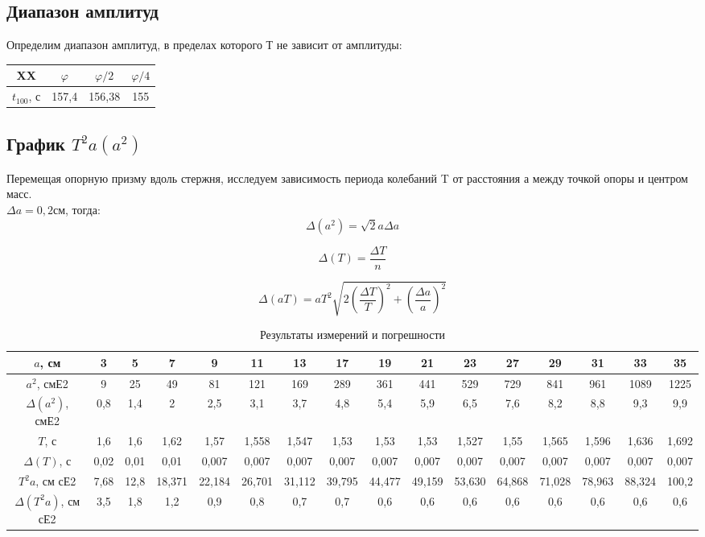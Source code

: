 \documentclass[13pt,a4paper]{article}
\begin{document}
\subsection{Диапазон амплитуд}

Определим диапазон амплитуд, в пределах которого Т не зависит от амплитуды:

\begin{center}
\begin{tabular}{|c|c|c|c|}
\hline
XX & $\varphi$ & $\varphi/2$ & $\varphi/4$ \\ \hline
$t_{100}$, с & 157,4 & 156,38 & 155 \\
\hline
\end{tabular}
\end{center}


\subsection{График $T^2a(a^2)$}
Перемещая опорную призму вдоль стержня, исследуем зависимость периода колебаний T от расстояния а между точкой опоры и центром масс.\\
$\Delta a=0,2$см, тогда:\\
\begin{displaymath}
\Delta(a^2)=\sqrt{2}a\Delta a
\end{displaymath}

\begin{displaymath}
\Delta(T)=\frac{\Delta T}{n}
\end{displaymath}

\begin{displaymath}
\Delta(aT)=aT^2\sqrt{2(\frac{\Delta T}{T})^2 + (\frac{\Delta a}{a})^2}
\end{displaymath}


\begin{table}[h!]
\begin{center}
\begin{tabular}{|c|c|c|c|c|c|c|c|c|c|c|c|c|c|c|c|}
\hline
$a$, см & 3 & 5 & 7 & 9 & 11 & 13 & 17 & 19 & 21 & 23 & 27 & 29 &31 & 33 & 35 \\  \hline
$a^2$, смЕ2 & 9 & 25 & 49 &81 & 121 & 169 & 289 & 361 & 441 & 529 & 729 & 841 & 961 & 1089 & 1225 \\ \hline
$\Delta(a^2)$, смЕ2 & 0,8 & 1,4 & 2 & 2,5 & 3,1 & 3,7 & 4,8 & 5,4 & 5,9 & 6,5 & 7,6 & 8,2 & 8,8 & 9,3 & 9,9 \\ \hline
$T$, с & 1,6 & 1,6 & 1,62 & 1,57 & 1,558 & 1,547 & 1,53 & 1,53 & 1,53 & 1,527 & 1,55 & 1,565 & 1,596 & 1,636 & 1,692 \\ \hline
$\Delta(T)$, с & 0,02 & 0,01 & 0,01 & 0,007 & 0,007 & 0,007 & 0,007 & 0,007 & 0,007 & 0,007 &0,007&0,007&0,007&0,007& 0,007 \\ \hline
$T^2a$, см сЕ2 &7,68&12,8&18,371&22,184&26,701&31,112&39,795&44,477&49,159&53,630&64,868&71,028&78,963&88,324&100,2 \\ \hline
$\Delta(T^2a)$, см сЕ2 &3,5&1,8&1,2&0,9&0,8&0,7&0,7&0,6&0,6&0,6&0,6&0,6&0,6&0,6&0,6 \\ \hline
\end{tabular}
\caption{Результаты измерений и погрешности}
\label{tab:main}
\end{center}
\end{table}
\end{document}
